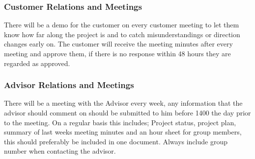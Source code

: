 \subsubsection{Customer Relations and Meetings}

There will be a demo for the customer on every customer meeting to let them
know how far along the project is and to catch misunderstandings or direction changes early on.
The customer will receive the meeting minutes after every meeting and approve them,
if there is no response within 48 hours they are regarded as approved.

\subsubsection{Advisor Relations and Meetings}

There will be a meeting with the Advisor every week, any information that the advisor
should comment on should be submitted to him before 1400 the day prior to the meeting.
On a regular basis this includes; Project status, project plan, summary of last weeks
meeting minutes and an hour sheet for group members, this should preferably be included in one document.
Always include group number when contacting the advisor.
